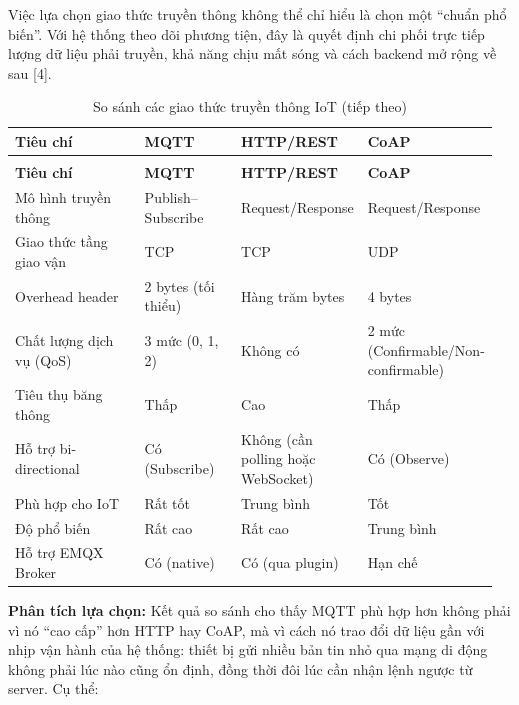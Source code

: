 \documentclass[a4paper]{extarticle}
\newcommand{\thesissettableid}[2]{%
  \renewcommand{\thetable}{#1}%
  \renewcommand{\theHtable}{#2}%
}
\begin{document}
Việc lựa chọn giao thức truyền thông không thể chỉ hiểu là chọn một
``chuẩn phổ biến''. Với hệ thống theo dõi phương tiện, đây là quyết định
chi phối trực tiếp lượng dữ liệu phải truyền, khả năng chịu mất sóng và
cách backend mở rộng về sau {[}4{]}.

{\thesissettableid{2.2}{tab-ch2-iot-communication-protocols}
\def\LTcaptype{table}
\begin{longtable}{|L{0.279\linewidth}|L{0.206\linewidth}|L{0.232\linewidth}|L{0.238\linewidth}|}
\caption{So sánh các giao thức truyền thông IoT}\label{tab:ch2-iot-communication-protocols}\\
\hline \textbf{Tiêu chí} & \textbf{MQTT} & \textbf{HTTP/REST} & \textbf{CoAP} \\
\hline
\endfirsthead
\caption[]{So sánh các giao thức truyền thông IoT (tiếp theo)}\\
\hline \textbf{Tiêu chí} & \textbf{MQTT} & \textbf{HTTP/REST} & \textbf{CoAP} \\
\hline
\endhead
\hline
\endfoot
\endlastfoot
Mô hình truyền thông & Publish--Subscribe & Request/Response &
Request/Response \\\hline
Giao thức tầng giao vận & TCP & TCP & UDP \\\hline
Overhead header & 2 bytes (tối thiểu) & Hàng trăm bytes & 4 bytes \\\hline
Chất lượng dịch vụ (QoS) & 3 mức (0, 1, 2) & Không có & 2 mức
(Confirmable/Non-confirmable) \\\hline
Tiêu thụ băng thông & Thấp & Cao & Thấp \\\hline
Hỗ trợ bi-directional & Có (Subscribe) & Không (cần polling hoặc WebSocket) &
Có (Observe) \\\hline
Phù hợp cho IoT & Rất tốt & Trung bình & Tốt \\\hline
Độ phổ biến & Rất cao & Rất cao & Trung bình \\\hline
Hỗ trợ EMQX Broker & Có (native) & Có (qua plugin) & Hạn chế \\\hline
\end{longtable}
}

\textbf{Phân tích lựa chọn:} Kết quả so sánh cho thấy MQTT phù hợp hơn
không phải vì nó ``cao cấp'' hơn HTTP hay CoAP, mà vì cách nó trao đổi
dữ liệu gần với nhịp vận hành của hệ thống: thiết bị gửi nhiều bản tin
nhỏ qua mạng di động không phải lúc nào cũng ổn định, đồng thời đôi lúc
cần nhận lệnh ngược từ server. Cụ thể:
\end{document}
